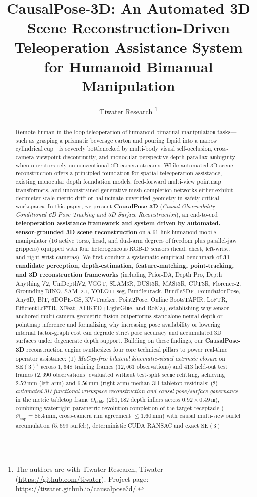\documentclass[10pt,journal]{IEEEtran}
\title{CausalPose-3D: An Automated 3D Scene Reconstruction-Driven Teleoperation Assistance System for Humanoid Bimanual Manipulation}
\author{Tiwater Research%
\thanks{The authors are with Tiwater Research, Tiwater (\url{https://github.com/tiwater}). Project page: \url{https://tiwater.github.io/causalpose3d/}.}}
\begin{document}
\maketitle

\begin{abstract}
Remote human-in-the-loop teleoperation of humanoid bimanual manipulation tasks---such as grasping a prismatic beverage carton and pouring liquid into a narrow cylindrical cup---is severely bottlenecked by multi-body visual self-occlusion, cross-camera viewpoint discontinuity, and monocular perspective depth-parallax ambiguity when operators rely on conventional 2D camera streams. While automated 3D scene reconstruction offers a principled foundation for spatial teleoperation assistance, existing monocular depth foundation models, feed-forward multi-view pointmap transformers, and unconstrained generative mesh completion networks either exhibit decimeter-scale metric drift or hallucinate unverified geometry in safety-critical workspaces. In this paper, we present \textbf{CausalPose-3D} (\emph{Causal Observability-Conditioned 6D Pose Tracking and 3D Surface Reconstruction}), an end-to-end \textbf{teleoperation assistance framework and system driven by automated, sensor-grounded 3D scene reconstruction} on a 61-link humanoid mobile manipulator (16 active torso, head, and dual-arm degrees of freedom plus parallel-jaw grippers) equipped with four heterogeneous RGB-D sensors (head, chest, left-wrist, and right-wrist cameras). We first conduct a systematic empirical benchmark of \textbf{31 candidate perception, depth-estimation, feature-matching, point-tracking, and 3D reconstruction frameworks} (including Prior-DA, Depth Pro, Depth Anything V2, UniDepthV2, VGGT, SLAM3R, DUSt3R, MASt3R, CUT3R, Florence-2, Grounding DINO, SAM~2.1, YOLO11-seg, BundleTrack, BundleSDF, FoundationPose, Any6D, BIT, 6DOPE-GS, KV-Tracker, Point2Pose, Online BootsTAPIR, LoFTR, EfficientLoFTR, XFeat, ALIKED+LightGlue, and RoMa), establishing why sensor-anchored multi-camera geometric fusion outperforms standalone neural depth or pointmap inference and formalizing why increasing pose availability or lowering internal factor-graph cost can degrade strict pose accuracy and accumulated 3D surfaces under degenerate depth support. Building on these findings, our \textbf{CausalPose-3D} reconstruction engine synthesizes four core technical pillars to power real-time operator assistance: (1) \emph{MoCap-free bilateral kinematic-visual extrinsic closure} on $\mathrm{SE}(3)^3$ across $1{,}648$ training frames ($12{,}061$ observations) and $413$ held-out test frames ($2{,}690$ observations) evaluated without test-split scene refitting, achieving $2.52\,\mathrm{mm}$ (left arm) and $6.56\,\mathrm{mm}$ (right arm) median 3D tabletop residuals; (2) \emph{automated 3D functional workspace reconstruction and causal pose/surface governance} in the metric tabletop frame $O_{\mathrm{table}}$ ($251{,}182$ depth inliers across $0.92\times 0.49\,\mathrm{m}$), combining watertight parametric revolution completion of the target receptacle ($\varnothing_{\mathrm{top}} = 85.4\,\mathrm{mm}$, cross-camera rim agreement $\le 1.60\,\mathrm{mm}$) with causal multi-view surfel accumulation ($5{,}699$ surfels), deterministic CUDA RANSAC and exact $\mathrm{SE}(3)$ 
\end{abstract}
\end{document}
